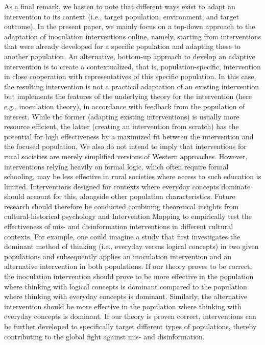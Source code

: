 \documentclass[authordate, reflection, issue]{jote-new-article}
\begin{document}
	As a final remark, we hasten to note that different ways exist to adapt an intervention to its context (i.e., target population, environment, and target outcome). In the present paper, we mainly focus on a top-down approach to the adaptation of inoculation interventions online, namely, starting from interventions that were already developed for a specific population and adapting these to another population. An alternative, bottom-up approach to develop an adaptive intervention is to create a contextualized, that is, population-specific, intervention in close cooperation with representatives of this specific population. In this case, the resulting intervention is not a practical adaptation of an existing intervention but implements the features of the underlying theory for the intervention (here e.g., inoculation theory), in accordance with feedback from the population of interest. While the former (adapting existing interventions) is usually more resource efficient, the latter (creating an intervention from scratch) has the potential for high effectiveness by a maximized fit between the intervention and the focused population. We also do not intend to imply that interventions for rural societies are merely simplified versions of Western approaches. However, interventions relying heavily on formal logic, which often require formal schooling, may be less effective in rural societies where access to such education is limited. Interventions designed for contexts where everyday concepts dominate should account for this, alongside other population characteristics. Future research should therefore be conducted combining theoretical insights from cultural-historical psychology and Intervention Mapping to empirically test the effectiveness of mis- and disinformation interventions in different cultural contexts. For example, one could imagine a study that first investigates the dominant method of thinking (i.e., everyday versus logical concepts) in two given populations and subsequently applies an inoculation intervention and an alternative intervention in both populations. If our theory proves to be correct, the inoculation intervention should prove to be more effective in the population where thinking with logical concepts is dominant compared to the population where thinking with everyday concepts is dominant. Similarly, the alternative intervention should be more effective in the population where thinking with everyday concepts is dominant. If our theory is proven correct, interventions can be further developed to specifically target different types of populations, thereby contributing to the global fight against mis- and disinformation.
\end{document}
